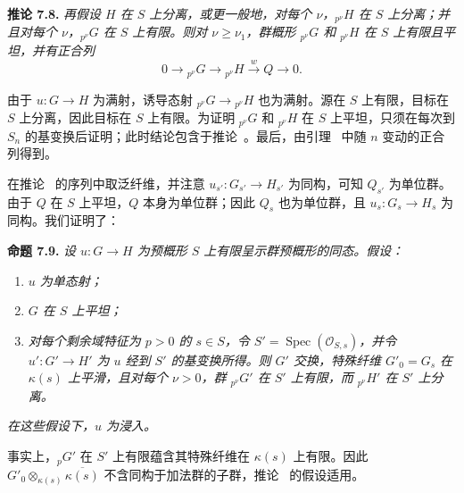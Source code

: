 \medskip
\noindent{}\textbf{推论 7.8.}
\textit{再假设 \(H\) 在 \(S\) 上分离，或更一般地，对每个 \(\nu\)，\({}_{p^\nu}H\) 在 \(S\) 上分离；并且对每个 \(\nu\)，\({}_{p^\nu}G\) 在 \(S\) 上有限。则对 \(\nu\geq\nu_1\)，群概形 \({}_{p^\nu}G\) 和 \({}_{p^\nu}H\) 在 \(S\) 上有限且平坦，并有正合列}
\[
  0\longrightarrow{}_{p^\nu}G
  \longrightarrow{}_{p^\nu}H
  \xrightarrow{\,w\,}Q
  \longrightarrow0.
\]

由于 \(u:G\to H\) 为满射，诱导态射 \({}_{p^\nu}G\to{}_{p^\nu}H\) 也为满射。源在 \(S\) 上有限，目标在 \(S\) 上分离，因此目标在 \(S\) 上有限。为证明 \({}_{p^\nu}G\) 和 \({}_{p^\nu}H\) 在 \(S\) 上平坦，只须在每次到 \(S_n\) 的基变换后证明；此时结论包含于推论~。最后，由引理~ 中随 \(n\) 变动的正合列得到。

在推论~ 的序列中取泛纤维，并注意 \(u_{s'}:G_{s'}\to H_{s'}\) 为同构，可知 \(Q_{s'}\) 为单位群。由于 \(Q\) 在 \(S\) 上平坦，\(Q\) 本身为单位群；因此 \(Q_s\) 也为单位群，且 \(u_s:G_s\to H_s\) 为同构。我们证明了：

\medskip
\noindent{}\textbf{命题 7.9.}
\textit{设 \(u:G\to H\) 为预概形 \(S\) 上有限呈示群预概形的同态。假设：}
\begin{enumerate}
  \item[(a)]
  \textit{\(u\) 为单态射；}
  \item[(b)]
  \textit{\(G\) 在 \(S\) 上平坦；}
  \item[(c)]
  \textit{对每个剩余域特征为 \(p>0\) 的 \(s\in S\)，令 \(S'=\operatorname{Spec}(\mathscr O_{S,s})\)，并令 \(u':G'\to H'\) 为 \(u\) 经到 \(S'\) 的基变换所得。则 \(G'\) 交换，特殊纤维 \(G'_0=G_s\) 在 \(\kappa(s)\) 上平滑，且对每个 \(\nu>0\)，群 \({}_{p^\nu}G'\) 在 \(S'\) 上有限，而 \({}_{p^\nu}H'\) 在 \(S'\) 上分离。}
\end{enumerate}
\textit{在这些假设下，\(u\) 为浸入。}

事实上，\({}_pG'\) 在 \(S'\) 上有限蕴含其特殊纤维在 \(\kappa(s)\) 上有限。因此 \(G'_0\otimes_{\kappa(s)}\overline{\kappa(s)}\) 不含同构于加法群的子群，推论~ 的假设适用。

